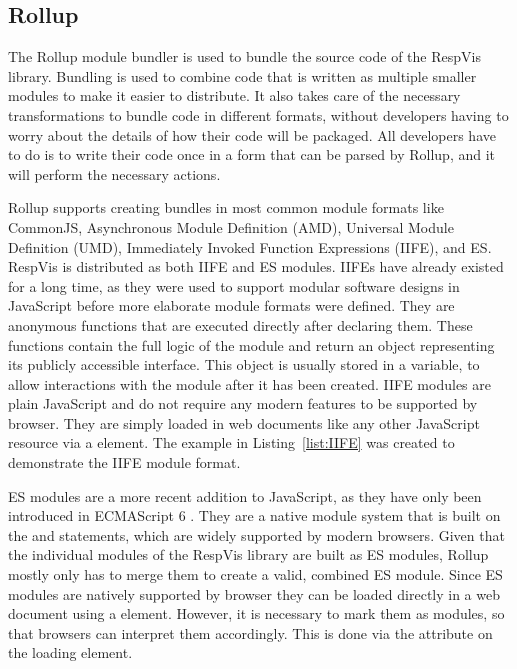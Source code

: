 




\subsection{Rollup}
\label{sec:Rollup}


The Rollup module bundler is used to bundle the source code of the RespVis library.
Bundling is used to combine code that is written as multiple smaller modules to make it easier to distribute.
It also takes care of the necessary transformations to bundle code in different formats, without developers having to worry about the details of how their code will be packaged.
All developers have to do is to write their code once in a form that can be parsed by Rollup, and it will perform the necessary actions.

Rollup supports creating bundles in most common module formats like CommonJS, Asynchronous Module Definition (AMD), Universal Module Definition (UMD), Immediately Invoked Function Expressions (IIFE), and ES.
RespVis is distributed as both IIFE and ES modules.
IIFEs have already existed for a long time, as they were used to support modular software designs in JavaScript before more elaborate module formats were defined.
They are anonymous functions that are executed directly after declaring them.
These functions contain the full logic of the module and return an object representing its publicly accessible interface.
This object is usually stored in a variable, to allow interactions with the module after it has been created. 
IIFE modules are plain JavaScript and do not require any modern features to be supported by browser.
They are simply loaded in web documents like any other JavaScript resource via a  element.
The example in Listing~\ref{list:IIFE} was created to demonstrate the IIFE module format. 

ES modules are a more recent addition to JavaScript, as they have only been introduced in ECMAScript 6 \parencite{ECMAScript6}.
They are a native module system that is built on the  and  statements, which are widely supported by modern browsers.
Given that the individual modules of the RespVis library are built as ES modules, Rollup mostly only has to merge them to create a valid, combined ES module.
Since ES modules are natively supported by browser they can be loaded directly in a web document using a  element.
However, it is necessary to mark them as modules, so that browsers can interpret them accordingly.
This is done via the  attribute on the loading  element.


